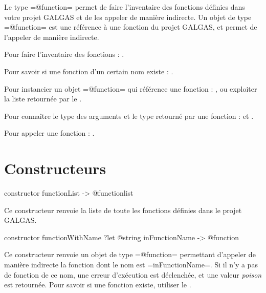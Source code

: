 



Le type \ggsq=@function= permet de faire l'inventaire des fonctions définies dans votre projet GALGAS et de les appeler de manière indirecte. Un objet de type \ggsq=@function= est une référence à une fonction du projet GALGAS, et permet de l'appeler de manière indirecte.

Pour faire l'inventaire des fonctions : .

Pour savoir si une fonction d'un certain nom existe : .

Pour instancier un objet \ggsq=@function= qui référence une fonction : , ou exploiter la liste retournée par le .

Pour connaître le type des arguments et le type retourné par une fonction :   et  .

Pour appeler une fonction :  .






\section{Constructeurs}



\begin{galgas4}
constructor functionList -> @functionlist
\end{galgas4}

Ce constructeur renvoie la liste de toute les fonctions définies dans le projet GALGAS.




\begin{galgas4}
constructor functionWithName ?let @string inFunctionName -> @function
\end{galgas4}

Ce constructeur renvoie un objet de type \ggsq=@function= permettant d'appeler de manière indirecte la fonction dont le nom est \ggsq=inFunctionName=. Si il n'y a pas de fonction de ce nom, une erreur d'exécution est déclenchée, et une valeur \emph{poison} est retournée. Pour savoir si une fonction existe, utiliser le .





